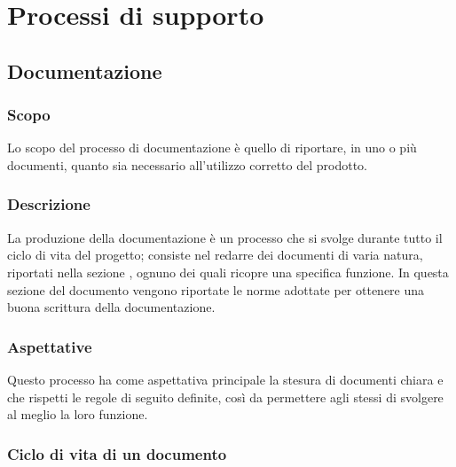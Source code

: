 \section{Processi di supporto}
\label{sec:processi_di_supporto}

\subsection{Documentazione}
\label{sub:doc}

\subsubsection{Scopo}
Lo scopo del processo di documentazione è quello di riportare, in uno o più documenti, quanto sia necessario 
all'utilizzo corretto del prodotto.

\subsubsection{Descrizione}
La produzione della documentazione è un processo che si svolge durante tutto il ciclo di vita del progetto; consiste 
nel redarre dei documenti di varia natura, riportati nella sezione , ognuno dei quali 
ricopre una specifica funzione. In questa sezione del documento vengono riportate le norme adottate per ottenere una 
buona scrittura della documentazione.

\subsubsection{Aspettative}
Questo processo ha come aspettativa principale la stesura di documenti chiara e che rispetti le regole di seguito 
definite, così da permettere agli stessi di svolgere al meglio la loro funzione.

\subsubsection{Ciclo di vita di un documento}
\label{ssub:ciclo_vita_doc}

